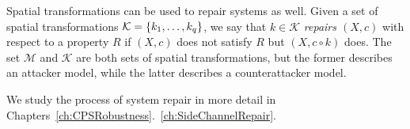 {%

Spatial transformations can be used to repair systems as well. Given a set of spatial transformations $\mathcal{K}=\left\{k_1,\ldots, k_q\right\}$, we say that $k\in \mathcal{K}$ \emph{repairs $(X,c)$} with respect to a property $R$ if $(X,c)$ does not satisfy $R$ but $(X,c\circ k)$ does. The set $\mathcal{M}$ and $\mathcal{K}$ are both sets of spatial transformations, but the former describes an attacker model, while the latter describes a counterattacker model.

We study the process of system repair in more detail in Chapters~\ref{ch:CPSRobustness}.~\ref{ch:SideChannelRepair}.



}
